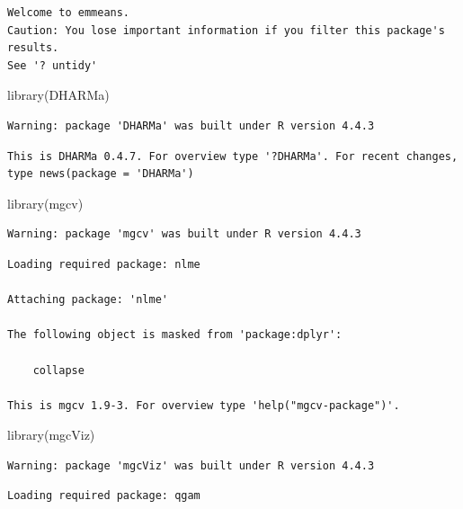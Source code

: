 \documentclass[
  letterpaper,
  DIV=11,
  numbers=noendperiod]{scrartcl}
\newenvironment{Shaded}{\begin{snugshade}}{\end{snugshade}}
\newcommand{\FunctionTok}[1]{\textcolor[rgb]{0.28,0.35,0.67}{#1}}
\newcommand{\NormalTok}[1]{\textcolor[rgb]{0.00,0.23,0.31}{#1}}
\begin{document}
\begin{verbatim}
Welcome to emmeans.
Caution: You lose important information if you filter this package's results.
See '? untidy'
\end{verbatim}

\begin{Shaded}
\begin{Highlighting}[]
\FunctionTok{library}\NormalTok{(DHARMa)}
\end{Highlighting}
\end{Shaded}

\begin{verbatim}
Warning: package 'DHARMa' was built under R version 4.4.3
\end{verbatim}

\begin{verbatim}
This is DHARMa 0.4.7. For overview type '?DHARMa'. For recent changes, type news(package = 'DHARMa')
\end{verbatim}

\begin{Shaded}
\begin{Highlighting}[]
\FunctionTok{library}\NormalTok{(mgcv)}
\end{Highlighting}
\end{Shaded}

\begin{verbatim}
Warning: package 'mgcv' was built under R version 4.4.3
\end{verbatim}

\begin{verbatim}
Loading required package: nlme

Attaching package: 'nlme'

The following object is masked from 'package:dplyr':

    collapse

This is mgcv 1.9-3. For overview type 'help("mgcv-package")'.
\end{verbatim}

\begin{Shaded}
\begin{Highlighting}[]
\FunctionTok{library}\NormalTok{(mgcViz)}
\end{Highlighting}
\end{Shaded}

\begin{verbatim}
Warning: package 'mgcViz' was built under R version 4.4.3
\end{verbatim}

\begin{verbatim}
Loading required package: qgam
\end{verbatim}
\end{document}
